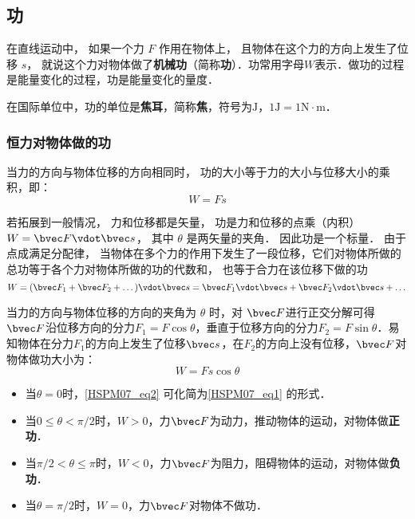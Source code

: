 
\begin{issues}
\issueDraft
\issueTODO
\end{issues}

\subsection{功}

在直线运动中， 如果一个力 $F$ 作用在物体上， 且物体在这个力的方向上发生了位移 $s$， 就说这个力对物体做了\textbf{机械功}（简称\textbf{功}）．功常用字母$W$表示．做功的过程是能量变化的过程，功是能量变化的量度．

在国际单位中，功的单位是\textbf{焦耳}，简称\textbf{焦}，符号为$\mathrm{J}$，$1\mathrm{J}=1\mathrm{N \cdot m}$．

\subsubsection{恒力对物体做的功}

当力的方向与物体位移的方向相同时， 功的大小等于力的大小与位移大小的乘积，即：
\begin{equation}\label{HSPM07_eq1}
W=Fs
\end{equation}

若拓展到一般情况， 力和位移都是矢量， 功是力和位移的点乘（内积） $W = \bvec F \vdot \bvec s$， 其中 $\theta$ 是两矢量的夹角． 因此功是一个标量． 由于点成满足分配律， 当物体在多个力的作用下发生了一段位移，它们对物体所做的总功等于各个力对物体所做的功的代数和， 也等于合力在该位移下做的功
\begin{equation}
W = (\bvec F_1 + \bvec F_2 + \dots)\vdot \bvec s = \bvec F_1 \vdot \bvec s + \bvec F_2 \vdot \bvec s + \dots
\end{equation}

当力的方向与物体位移的方向的夹角为 $\theta$ 时，对 $\bvec F$进行正交分解可得$\bvec F$沿位移方向的分力$F_1=F\cos \theta$，垂直于位移方向的分力$F_2=F\sin \theta$．易知物体在分力$F_1$的方向上发生了位移$\bvec s$，在$F_2$的方向上没有位移，$\bvec F$对物体做功大小为：
\begin{equation}\label{HSPM07_eq2}
W=Fs\cos \theta
\end{equation}

\begin{itemize}
\item 当$\theta = 0$时，\autoref{HSPM07_eq2} 可化简为\autoref{HSPM07_eq1} 的形式．
\item 当$0\leq \theta < \pi/2$时，$W>0$，力$\bvec F$为动力，推动物体的运动，对物体做\textbf{正功}．
\item 当$\pi/2< \theta \leq \pi$时，$W<0$，力$\bvec F$为阻力，阻碍物体的运动，对物体做\textbf{负功}．
\item 当$\theta = \pi/2$时，$W=0$，力$\bvec F$对物体不做功．
\end{itemize}

